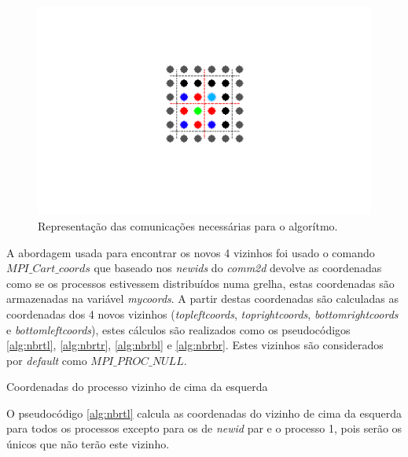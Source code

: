 \documentclass[10pt]{extarticle}
\begin{document}
\begin{figure}[H]
  \centering
  \includegraphics[width=\linewidth]{model_code_parallelization_alineac.png}
  \caption{Representação das comunicações necessárias para o algorítmo.}
  \label{fig:comunDiag}
  \end{figure}
  
A abordagem usada para encontrar os novos 4 vizinhos foi usado o comando \textit{$MPI\_Cart\_coords$} que baseado nos \textit{newids} do \textit{comm2d} devolve as coordenadas como se os processos estivessem distribuídos numa grelha, estas coordenadas são armazenadas na variável \textit{mycoords}. A partir destas coordenadas são calculadas as coordenadas dos 4 novos vizinhos (\textit{topleftcoords}, \textit{toprightcoords}, \textit{bottomrightcoords} e \textit{bottomleftcoords}), estes cálculos são realizados como os pseudocódigos \ref{alg:nbrtl}, \ref{alg:nbrtr}, \ref{alg:nbrbl} e \ref{alg:nbrbr}. Estes vizinhos são considerados por \textit{default} como \textit{$MPI\_PROC\_NULL$}.

\pagebreak

\begin{algorithm}[H]
   
 \caption{Coordenadas do processo vizinho de cima da esquerda}
 \label{alg:nbrtl}
 \end{algorithm}
 
O pseudocódigo \ref{alg:nbrtl} calcula as coordenadas do vizinho de cima da esquerda para todos os processos excepto para os de \textit{newid} par e o processo 1, pois serão os únicos que não terão este vizinho.
\end{document}
